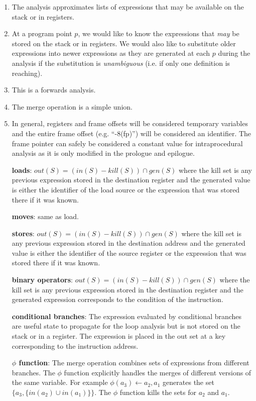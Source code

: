 \begin{enumerate}
  \item The analysis approximates lists of expressions that may be available on the stack or in registers.
  \item At a program point $p$, we would like to know the expressions that \textit{may} be stored on the stack or in registers.  We would also like to substitute older expressions into newer expressions as they are generated at each $p$ during the analysis if the substitution is \textit{unambiguous} (i.e. if only one definition is reaching).
  \item This is a forwards analysis.
  \item The merge operation is a simple union. 
  \item In general, registers and frame offsets will be considered temporary variables and the entire frame offset (e.g. ``-8(fp)'') will be considered an identifier. The frame pointer can safely be considered a constant value for intraprocedural analysis as it is only modified in the prologue and epilogue.
   
  \textbf{loads}: $out(S) = (in(S) - kill(S)) \cap gen(S)$ where the kill set is any previous expression stored in the destination register and the generated value is either the identifier of the load source or the expression that was stored there if it was known. 
  
  \textbf{moves}: same as load.
  
  \textbf{stores}: $out(S) = (in(S) - kill(S)) \cap gen(S)$ where the kill set is any previous expression stored in the destination address and the generated value is either the identifier of the source register or the expression that was stored there if it was known.
  
  \textbf{binary operators}: $out(S) = (in(S) - kill(S)) \cap gen(S)$ where the kill set is any previous expression stored in the destination register and the generated expression corresponds to the condition of the instruction.
  
  \textbf{conditional branches}: The expression evaluated by conditional branches are useful state to propagate for the loop analysis but is not stored on the stack or in a register. The expression is placed in the out set at a key corresponding to the instruction address.
  
  \textbf{$\phi$ function}: The merge operation combines sets of expressions from different branches. The $\phi$ function explicitly handles the merges of different versions of the same variable. For example $\phi(a_3) \leftarrow a_2,a_1$ generates the set $\{a_3, \{in(a_2) \cup in(a_1)\}\}$. The $\phi$ function kills the sets for $a_2$ and $a_1$.
  

\end{enumerate}
